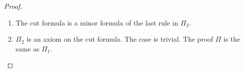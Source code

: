 \begin{proof}
\begin{enumerate}
\begin{itemize}
    \item \ElledruleSXXGlName / $\cat{L}$-sequent:
      \begin{center}
        \scriptsize
        $\Pi_1$:
        \begin{math}
          $$\mprset{flushleft}
          \inferrule* [right={\tiny GL}] {
            {
              \begin{array}{c}
                \pi_1 \\
                {<<G1, A, G2 |-l B>>}
              \end{array}
            }
          }{<<G1, Gf A, G2 |-l B>>}
        \end{math}
        \qquad\qquad
        \begin{math}
          \begin{array}{c}
            \Pi_2 \\
            {<<D1, B, D2 |-l C>>}
          \end{array}
        \end{math}
      \end{center}
      By assumption, $c(\Pi_1),c(\Pi_2)\leq |B|$. By induction, there is a proof $\Pi'$ from
      $\pi_2$ and $\Pi_2$ for $<<D1, G1, A, G2, D2 |-l C>>$ s.t. $c(\Pi')\leq |B|$.
      Therefore, the proof $\Pi$ can be constructed as follows with $c(\Pi)\leq |B|$.
      \begin{center}
        \scriptsize
        \begin{math}
          $$\mprset{flushleft}
          \inferrule* [right={\tiny GL}] {
            $$\mprset{flushleft}
            \inferrule* [right={\tiny cut2}] {
              {
                \begin{array}{cc}
                  \pi_2 & \Pi_2 \\
                  {<<G1, A, G2 |-l B>>} & {<<D1, B, D2 |-l C>>}
                \end{array}
              }
            }{<<D1, G1, A, G2, D2 |-l C>>}
          }{<<D1, G1, Gf A, G2, D2 |-l C>>}
        \end{math}
      \end{center}

    \end{itemize}

  \item The cut formula is a minor formula of the last rule in $\Pi_2$. 

  \item $\Pi_2$ is an axiom on the cut formula. The case is trivial. The proof $\Pi$ is the
        same as $\Pi_1$.

  \end{enumerate}
\end{proof}

